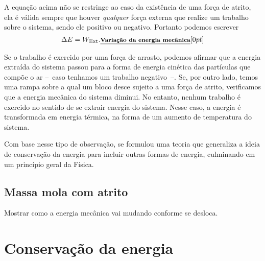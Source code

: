 A equação acima não se restringe ao caso da existência de uma força de atrito, ela é válida sempre que houver \emph{qualquer} força externa que realize um trabalho sobre o sistema, sendo ele positivo ou negativo. Portanto podemos escrever
\begin{equation}
  \Delta E = W_{\textrm{Ext}}. \relax{\footnotesize\emph{\textbf{Variação da energia mecânica}}}[0pt]
\end{equation}

Se o trabalho é exercido por uma força de arrasto, podemos afirmar que a energia extraída do sistema passou para a forma de energia cinética das partículas que compõe o ar --~caso tenhamos um trabalho negativo~--. Se, por outro lado, temos uma rampa sobre a qual um bloco desce sujeito a uma força de atrito, verificamos que a energia mecânica do sistema diminui. No entanto, nenhum trabalho é exercido no sentido de se extrair energia do sistema. Nesse caso, a energia é transformada em energia térmica, na forma de um aumento de temperatura do sistema.

Com base nesse tipo de observação, se formulou uma teoria que generaliza a ideia de conservação da energia para incluir outras formas de energia, culminando em um princípio geral da Física.
 

\subsection{Massa mola com atrito}

Mostrar como a energia mecânica vai mudando conforme se desloca.

\section{Conservação da energia}

